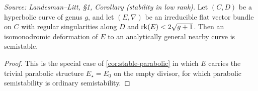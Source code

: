 \begin{corollary}
  \label{cor:stable}
  \textit{Source: Landesman--Litt, \S1, Corollary (stability in low rank).}
  Let $(C, D)$ be a hyperbolic curve of genus $g$, and let $(E, \nabla)$ be an
  irreducible flat vector bundle on $C$ with regular singularities along $D$ and
  $\operatorname{rk}(E) < 2\sqrt{g+1}$. Then an isomonodromic deformation of $E$ to an
  analytically general nearby curve is semistable.
\end{corollary}

\begin{proof}
  This is the special case of \cref{cor:stable-parabolic} in which $E$ carries the
  trivial parabolic structure $E_\star = E_0$ on the empty divisor, for which
  parabolic semistability is ordinary semistability.
\end{proof}
